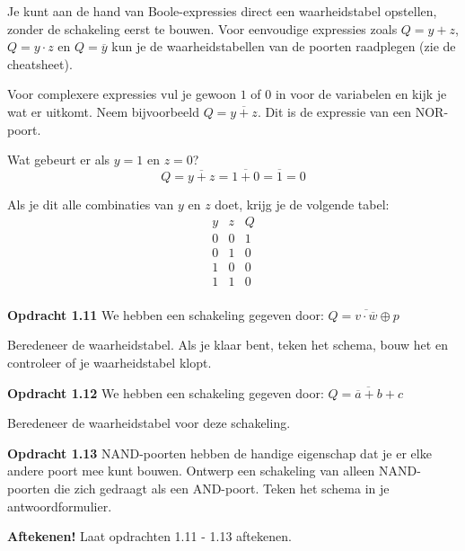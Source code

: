 \documentclass[11pt,a5paper]{report}
\begin{document}
Je kunt aan de hand van Boole-expressies direct een waarheidstabel opstellen, zonder de schakeling eerst te bouwen. Voor eenvoudige expressies zoals $Q = y + z$, $Q = y \cdot z$ en $Q = \overline{y}$ kun je de waarheidstabellen van de poorten raadplegen (zie de cheatsheet).

Voor complexere expressies vul je gewoon $1$ of $0$ in voor de variabelen en kijk je wat er uitkomt. Neem bijvoorbeeld $Q = \overline{y + z}$. Dit is de expressie van een NOR-poort.

Wat gebeurt er als $y = 1$ en $z = 0$?
\[
Q = \overline{y + z} = \overline{1 + 0} = \overline{1} = 0
\]

Als je dit alle combinaties van $y$ en $z$ doet, krijg je de volgende tabel:
\[
\begin{array}{cc|c}
y & z & Q \\
\hline
0 & 0 & 1 \\
0 & 1 & 0 \\
1 & 0 & 0 \\
1 & 1 & 0 \\
\end{array}
\]

\begin{framed}
\textbf{Opdracht 1.11} We hebben een schakeling gegeven door:
\(
Q = \overline{v \cdot \overline{w}} \oplus p
\)

Beredeneer de waarheidstabel. Als je klaar bent, teken het schema, bouw het en controleer of je waarheidstabel klopt.
\end{framed}

\begin{framed}
\textbf{Opdracht 1.12} We hebben een schakeling gegeven door:
\(
Q = \overline{\overline{a} + b} + c
\)

Beredeneer de waarheidstabel voor deze schakeling.
\end{framed}

\begin{framed} 
\textbf{Opdracht 1.13} NAND-poorten hebben de handige eigenschap dat je er elke andere poort mee kunt bouwen. Ontwerp een schakeling van alleen NAND-poorten die zich gedraagt als een AND-poort. Teken het schema in je antwoordformulier.
\end{framed}

\begin{framed}
\textbf{Aftekenen!} Laat opdrachten 1.11 - 1.13 aftekenen.
\end{framed}
\end{document}

